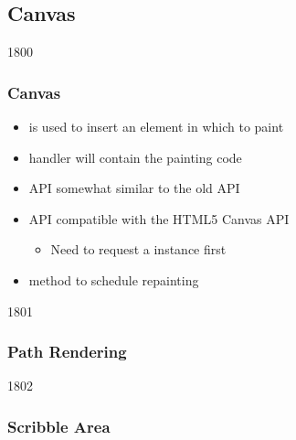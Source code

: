%
%
%
%

\subsection{Canvas}


\begin{slide}{1800}\frametitle{Canvas}

\begin{itemize}
\item {} is used to insert an element in which to paint
\item {} handler will contain the painting code
\item API somewhat similar to the old  API
\item API compatible with the HTML5 Canvas API
  \begin{itemize}
  \item Need to request a  instance first
  \end{itemize}
\item {} method to schedule repainting
\end{itemize}
\end{slide}


\begin{slide}{1801}\frametitle{Path Rendering}


\end{slide}


\begin{slide}{1802}\frametitle{Scribble Area}

\end{slide}

